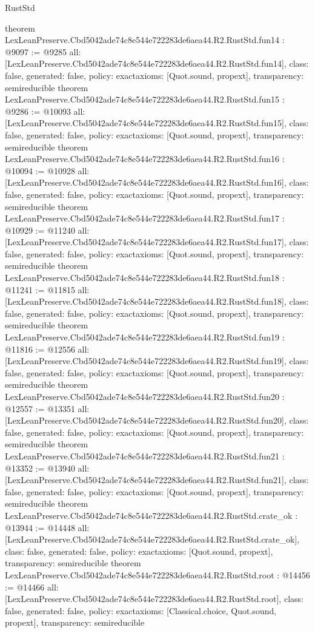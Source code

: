 \begin{lexlean}{RustStd}
\begin{coremodule}
{}
theorem LexLeanPreserve.Cbd5042ade74c8e544e722283de6aea44.R2.RustStd.fun14 : @9097 := @9285 {
  all: [LexLeanPreserve.Cbd5042ade74c8e544e722283de6aea44.R2.RustStd.fun14],
  class: false,
  generated: false,
  policy: exact{axioms: [Quot.sound, propext]},
  transparency: semireducible
}
theorem LexLeanPreserve.Cbd5042ade74c8e544e722283de6aea44.R2.RustStd.fun15 : @9286 := @10093 {
  all: [LexLeanPreserve.Cbd5042ade74c8e544e722283de6aea44.R2.RustStd.fun15],
  class: false,
  generated: false,
  policy: exact{axioms: [Quot.sound, propext]},
  transparency: semireducible
}
theorem LexLeanPreserve.Cbd5042ade74c8e544e722283de6aea44.R2.RustStd.fun16 : @10094 := @10928 {
  all: [LexLeanPreserve.Cbd5042ade74c8e544e722283de6aea44.R2.RustStd.fun16],
  class: false,
  generated: false,
  policy: exact{axioms: [Quot.sound, propext]},
  transparency: semireducible
}
theorem LexLeanPreserve.Cbd5042ade74c8e544e722283de6aea44.R2.RustStd.fun17 : @10929 := @11240 {
  all: [LexLeanPreserve.Cbd5042ade74c8e544e722283de6aea44.R2.RustStd.fun17],
  class: false,
  generated: false,
  policy: exact{axioms: [Quot.sound, propext]},
  transparency: semireducible
}
theorem LexLeanPreserve.Cbd5042ade74c8e544e722283de6aea44.R2.RustStd.fun18 : @11241 := @11815 {
  all: [LexLeanPreserve.Cbd5042ade74c8e544e722283de6aea44.R2.RustStd.fun18],
  class: false,
  generated: false,
  policy: exact{axioms: [Quot.sound, propext]},
  transparency: semireducible
}
theorem LexLeanPreserve.Cbd5042ade74c8e544e722283de6aea44.R2.RustStd.fun19 : @11816 := @12556 {
  all: [LexLeanPreserve.Cbd5042ade74c8e544e722283de6aea44.R2.RustStd.fun19],
  class: false,
  generated: false,
  policy: exact{axioms: [Quot.sound, propext]},
  transparency: semireducible
}
theorem LexLeanPreserve.Cbd5042ade74c8e544e722283de6aea44.R2.RustStd.fun20 : @12557 := @13351 {
  all: [LexLeanPreserve.Cbd5042ade74c8e544e722283de6aea44.R2.RustStd.fun20],
  class: false,
  generated: false,
  policy: exact{axioms: [Quot.sound, propext]},
  transparency: semireducible
}
theorem LexLeanPreserve.Cbd5042ade74c8e544e722283de6aea44.R2.RustStd.fun21 : @13352 := @13940 {
  all: [LexLeanPreserve.Cbd5042ade74c8e544e722283de6aea44.R2.RustStd.fun21],
  class: false,
  generated: false,
  policy: exact{axioms: [Quot.sound, propext]},
  transparency: semireducible
}
theorem LexLeanPreserve.Cbd5042ade74c8e544e722283de6aea44.R2.RustStd.crate_ok : @13944 := @14448 {
  all: [LexLeanPreserve.Cbd5042ade74c8e544e722283de6aea44.R2.RustStd.crate_ok],
  class: false,
  generated: false,
  policy: exact{axioms: [Quot.sound, propext]},
  transparency: semireducible
}
theorem LexLeanPreserve.Cbd5042ade74c8e544e722283de6aea44.R2.RustStd.root : @14456 := @14466 {
  all: [LexLeanPreserve.Cbd5042ade74c8e544e722283de6aea44.R2.RustStd.root],
  class: false,
  generated: false,
  policy: exact{axioms: [Classical.choice, Quot.sound, propext]},
  transparency: semireducible
}


\end{coremodule}
\end{lexlean}
